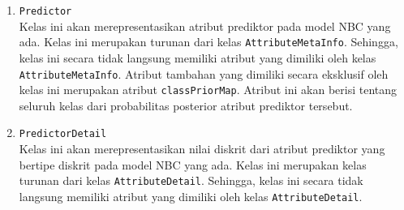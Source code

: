 \begin{enumerate}
\begin{enumerate}
		\item \texttt{Predictor}\\
		Kelas ini akan merepresentasikan atribut prediktor pada model NBC yang ada. Kelas ini merupakan turunan dari kelas \texttt{AttributeMetaInfo}. Sehingga, kelas ini secara tidak langsung memiliki atribut yang dimiliki oleh kelas \texttt{AttributeMetaInfo}. Atribut tambahan yang dimiliki secara eksklusif oleh kelas ini merupakan atribut \texttt{classPriorMap}. Atribut ini akan berisi tentang seluruh kelas dari probabilitas posterior atribut prediktor tersebut.

		\item \texttt{PredictorDetail}\\
		Kelas ini akan merepresentasikan nilai diskrit dari atribut prediktor yang bertipe diskrit pada model NBC yang ada. Kelas ini merupakan kelas turunan dari kelas \texttt{AttributeDetail}. Sehingga, kelas ini secara tidak langsung memiliki atribut yang dimiliki oleh kelas \texttt{AttributeDetail}.
	\end{enumerate}
	
\end{enumerate}


